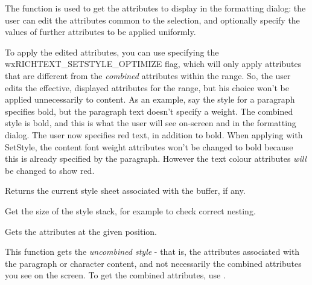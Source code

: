 The function is used to get the attributes to display in the formatting dialog: the user
can edit the attributes common to the selection, and optionally specify the values of further
attributes to be applied uniformly.

To apply the edited attributes, you can use  specifying
the wxRICHTEXT\_SETSTYLE\_OPTIMIZE flag, which will only apply attributes that are different
from the {\it combined} attributes within the range. So, the user edits the effective, displayed attributes
for the range, but his choice won't be applied unnecessarily to content. As an example,
say the style for a paragraph specifies bold, but the paragraph text doesn't specify a weight. The
combined style is bold, and this is what the user will see on-screen and in the formatting
dialog. The user now specifies red text, in addition to bold. When applying with
SetStyle, the content font weight attributes won't be changed to bold because this is already specified
by the paragraph. However the text colour attributes {\it will} be changed to
show red.

\label{wxrichtextbuffergetstylesheet}


Returns the current style sheet associated with the buffer, if any.

\label{wxrichtextbuffergetstylestacksize}


Get the size of the style stack, for example to check correct nesting.

\label{wxrichtextbuffergetuncombinedstyle}



Gets the attributes at the given position.

This function gets the {\it uncombined style} - that is, the attributes associated with the
paragraph or character content, and not necessarily the combined attributes you see on the
screen. To get the combined attributes, use .

